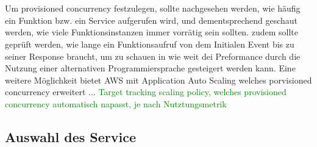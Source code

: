\documentclass[11pt]{article}
\begin{document}
\cite{van2019spec}
\cite{Yussupov2019_SystematicMappingStudyFaaS}
\cite{lee2018evaluation}
\cite{aws2020ManagingFunctions}
\\\\
Um provisioned concurrency festzulegen, sollte nachgesehen werden, wie häufig ein Funktion bzw. ein Service aufgerufen wird, und dementsprechend geschaut werden, wie viele Funktionsinstanzen immer vorrätig sein sollten. zudem sollte geprüft werden, wie lange ein Funktionsaufruf von dem Initialen Event bis zu seiner Response braucht, um zu schauen in wie weit dei Preformance durch die Nutzung einer alternativen Programmiersprache gesteigert werden kann. 
Eine weitere Möglichkeit bietet AWS mit Application Auto Scaling welches porvisioned concurrency erweitert ... \textcolor{green}{Target tracking scaling policy, welches provisioned concurrency automatisch napasst, je nach Nutztungsmetrik}
 
\subsection{Auswahl des Service}
\end{document}
